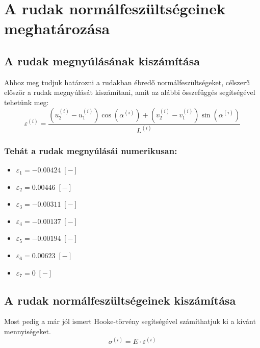 \documentclass[12pt,a4paper]{article}
\def\i{\left(i\right)}
\def\fos{\; \left[-\right]}
\begin{document}
\section{A rudak normálfeszültségeinek meghatározása}
\subsection{A rudak megnyúlásának kiszámítása}
Ahhoz meg tudjuk határozni a rudakban ébredő normálfeszültségeket,
célszerű először a rudak megnyúlását kiszámítani, amit az alábbi összefüggés
segítségével tehetünk meg:
\begin{equation}
    \boxed{
    \varepsilon^{\i}=\frac{(u_2^{\i}-u_1^{\i})
    \cos \left(\alpha^{\i}\right)+(v_2^{\i}-v_1^{\i})
    \sin \left(\alpha^{\i}\right)}{L^{\i}}
    }
\end{equation}
\subsubsection*{Tehát a rudak megnyúlásái numerikusan:}
\begin{multicols}{2}
    \begin{itemize}
        \item $\varepsilon_1= -0.00424 \fos$
        \item $\varepsilon_2= 0.00446 \fos$
        \item $\varepsilon_3= -0.00311 \fos$
        \item $\varepsilon_4= -0.00137 \fos$
    \end{itemize}
    \columnbreak
    \begin{itemize}
        \item $\varepsilon_5= -0.00194  \fos$
        \item $\varepsilon_6=  0.00623 \fos$
        \item $\varepsilon_7=  0 \fos$
    \end{itemize}
\end{multicols}
\subsection{A rudak normálfeszültségeinek kiszámítása}
Most pedig a már jól ismert Hooke-törvény segítségével számíthatjuk ki
a kívánt mennyiségeket.
\begin{equation}
    \boxed{\sigma^{\i}=E \cdot \varepsilon^{\i}}
\end{equation}
\end{document}
